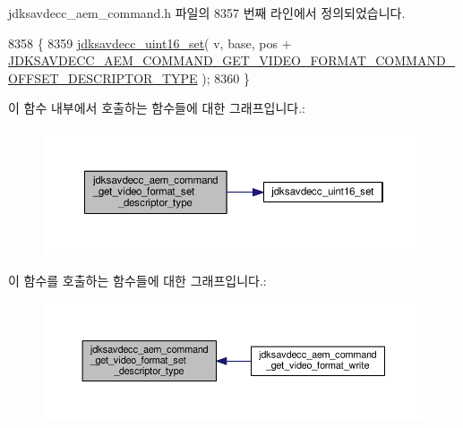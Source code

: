 jdksavdecc\+\_\+aem\+\_\+command.\+h 파일의 8357 번째 라인에서 정의되었습니다.


\begin{DoxyCode}
8358 \{
8359     \hyperlink{group__endian_ga14b9eeadc05f94334096c127c955a60b}{jdksavdecc\_uint16\_set}( v, base, pos + 
      \hyperlink{group__command__get__video__format_ga1d825a4673b5d5c62d77ecd8d4cace55}{JDKSAVDECC\_AEM\_COMMAND\_GET\_VIDEO\_FORMAT\_COMMAND\_OFFSET\_DESCRIPTOR\_TYPE}
       );
8360 \}
\end{DoxyCode}


이 함수 내부에서 호출하는 함수들에 대한 그래프입니다.\+:
\nopagebreak
\begin{figure}[H]
\begin{center}
\leavevmode
\includegraphics[width=350pt]{group__command__get__video__format_gaf8f4de958a90bc2347ea541ffe7e2508_cgraph}
\end{center}
\end{figure}




이 함수를 호출하는 함수들에 대한 그래프입니다.\+:
\nopagebreak
\begin{figure}[H]
\begin{center}
\leavevmode
\includegraphics[width=350pt]{group__command__get__video__format_gaf8f4de958a90bc2347ea541ffe7e2508_icgraph}
\end{center}
\end{figure}


